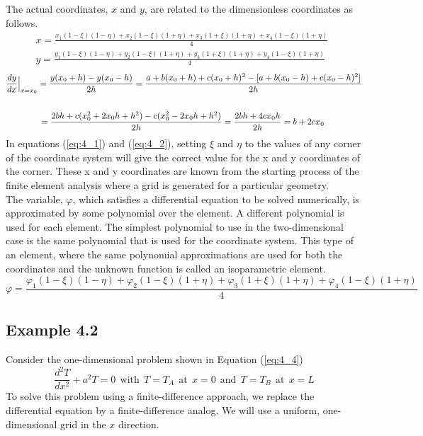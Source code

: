 \documentclass[12pt]{report}
\newcommand{\sps}{\\[0.2cm]}
\newcommand{\spn}[1]{\\[#1cm]}
\newcommand{\refn}[1]{(\ref{#1})}
\newcommand{\refx}[1]{\refn{eq:#1}}
\newcommand{\NI}{\noindent}
\begin{document}
	\NI The actual coordinates, $x$ and $y$, are related to the dimensionless coordinates as follows.
	\begin{eqnarray}
		x = \frac{x_1(1-\xi)(1-\eta) + x_2(1-\xi)(1+\eta) + x_3(1+\xi)(1+\eta) + x_4(1-\xi)(1+\eta)}{4}~~\label{eq:4_1}\spn{0.6}
		y = \frac{y_1(1-\xi)(1-\eta) + y_2(1-\xi)(1+\eta) + y_3(1+\xi)(1+\eta) + y_4(1-\xi)(1+\eta)}{4}~~\label{eq:4_2}
	\end{eqnarray}
	\newpage
	\begin{eqnarray}
		\frac{dy}{dx}\Big|_{x=x_0} = \frac{y(x_0+h) - y(x_0 -h)}{2h}  = \frac{a+b(x_0+h) + c(x_0+h)^2 - [a+b(x_0-h) + c(x_0 - h)^2]}{2h} \notag\spn{0.6}
		= \frac{2bh + c(x_0^2 + 2x_0h + h^2)-c(x_0^2-2x_0h + h^2)}{2h}=\frac{2bh + 4cx_0h}{2h} = b+2cx_0~~~~~~~~~~~~~\notag
	\end{eqnarray}
	In equations \refx{4_1} and \refx{4_2}, setting $\xi$ and $\eta$ to the values of any corner of the coordinate system will give the correct value for the x and y coordinates of the corner. These x and y coordinates are known from the starting process of the finite element analysis where a grid is generated for a particular geometry.\sps
	
	\NI The variable, $\varphi$, which satisfies a differential equation to be solved numerically, is approximated by some polynomial over the element. A different polynomial is used for each element. The simplest polynomial to use in the two-dimensional case is the same polynomial that is used for the coordinate system. This type of an element, where the same polynomial approximations are used for both the coordinates and the unknown function is called an isoparametric element.
	\begin{equation}
		\varphi = \frac{\varphi_1(1-\xi)(1-\eta) + \varphi_2(1-\xi)(1+\eta) + \varphi_3(1+\xi)(1+\eta) + \varphi_4(1-\xi)(1+\eta)}{4}\label{eq:4_3}
	\end{equation}
	
	\subsection*{Example 4.2}
	Consider the one-dimensional problem shown in Equation \refx{4_4}
	\begin{equation}
		\frac{d^2T}{dx^2}+a^2T = 0 ~~ \text{with}~~ T=T_A ~~\text{at}~~ x=0 ~~\text{and}~~ T=T_B ~~\text{at}~~ x = L\label{eq:4_4}
	\end{equation}
	To solve this problem using a finite-difference approach, we replace the differential equation by a finite-difference analog. We will use a uniform, one-dimensional grid in the $x$ direction.\\
	
\end{document}
